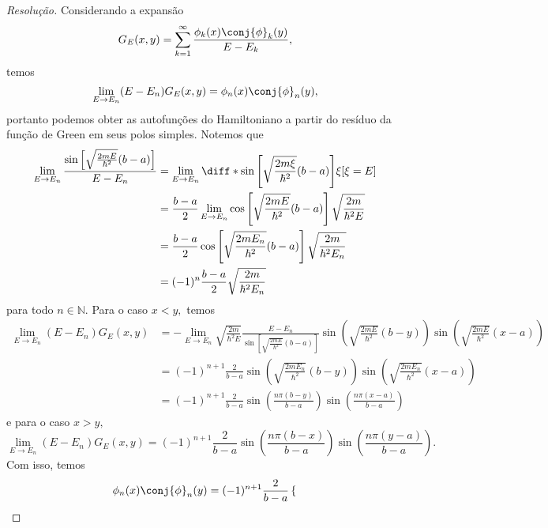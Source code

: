 \begin{proof}[Resolução]
   Considerando a expansão
   \begin{equation*}
      G_E(x,y) = \sum_{k = 1}^\infty \frac{\phi_k(x) \conj{\phi}_k(y)}{E - E_k},
   \end{equation*}
   temos
   \begin{equation*}
      \lim_{E \to E_n} (E - E_n) G_E(x,y) = \phi_n(x) \conj{\phi}_n(y),
   \end{equation*}
   portanto podemos obter as autofunções do Hamiltoniano a partir do resíduo da função de Green em seus polos simples. Notemos que 
   \begin{align*}
      \lim_{E \to E_n}{\frac{\sin\left[\sqrt{\frac{2mE}{\hbar^2}} (b - a)\right]}{E - E_n}} 
      &= \lim_{E \to E_n}{\diff*{\sin\left[\sqrt{\frac{2m\xi}{\hbar^2}} (b - a)\right]}{\xi}[\xi = E]}\\
      &= \frac{b - a}{2}\lim_{E \to E_n}{\cos\left[\sqrt{\frac{2mE}{\hbar^2}} (b - a)\right] \sqrt{\frac{2m}{\hbar^2 E}}}\\
      &= \frac{b - a}{2}\cos\left[\sqrt{\frac{2mE_n}{\hbar^2}} (b - a)\right] \sqrt{\frac{2m}{\hbar^2 E_n}}\\
      &= (-1)^n\frac{b - a}{2} \sqrt{\frac{2m}{\hbar^2 E_n}}
   \end{align*}
   para todo \(n \in \mathbb{N}.\) Para o caso \(x < y,\) temos
   \begin{align*}
      \lim_{E \to E_n} (E - E_n) G_E(x,y) &= -\lim_{E \to E_n}\sqrt{\frac{2m}{\hbar^2 E}}\frac{E - E_n}{\sin\left[\sqrt{\frac{2mE}{\hbar^2}} (b - a)\right]} \sin\left(\sqrt{\frac{2mE}{\hbar^2}} (b-y)\right)\sin\left(\sqrt{\frac{2mE}{\hbar^2}} (x-a)\right)\\
                                          &= (-1)^{n+1}\frac{2}{b - a} \sin\left(\sqrt{\frac{2mE_n}{\hbar^2}} (b-y)\right)\sin\left(\sqrt{\frac{2mE_n}{\hbar^2}} (x-a)\right)\\
                                          &= (-1)^{n+1}\frac{2}{b-a} \sin\left(\frac{n \pi (b - y)}{b - a}\right) \sin\left(\frac{n \pi (x - a)}{b - a}\right)
   \end{align*}
   e para o caso \(x > y,\)
   \begin{equation*}
      \lim_{E \to E_n} (E - E_n) G_E(x,y) = (-1)^{n+1}\frac{2}{b-a} \sin\left(\frac{n \pi (b - x)}{b - a}\right) \sin\left(\frac{n \pi (y - a)}{b - a}\right).
   \end{equation*}
   Com isso, temos
   \begin{equation*}
      \phi_n(x)\conj{\phi}_n(y) = (-1)^{n+1}\frac{2}{b - a}\begin{cases}

\end{cases}
\end{equation*}
\end{proof}
